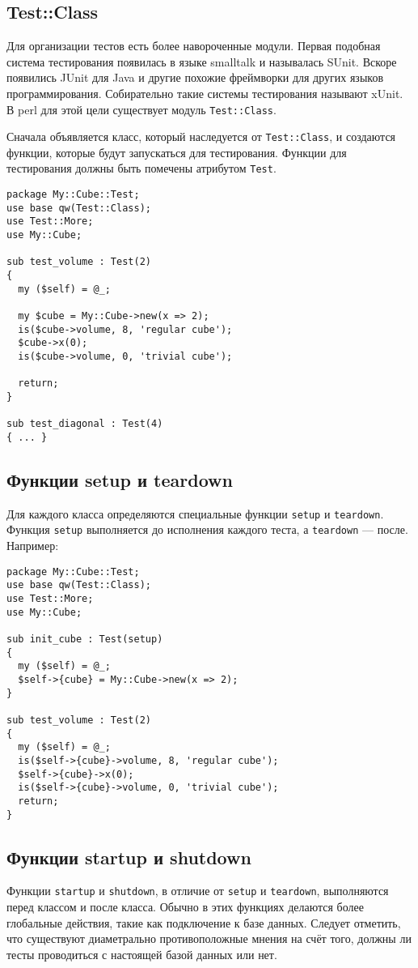 \subsection{Test::Class}
Для организации тестов есть более навороченные модули. Первая подобная система тестирования появилась в языке smalltalk и называлась SUnit. Вскоре появились JUnit для Java и другие похожие фреймворки для других языков программирования. Собирательно такие системы тестирования называют xUnit. В perl для этой цели существует модуль \verb|Test::Class|.

Сначала объявляется класс, который наследуется от \verb|Test::Class|, и создаются функции, которые будут запускаться для тестирования. Функции для тестирования должны быть помечены атрибутом \verb|Test|.
\begin{verbatim}
package My::Cube::Test;
use base qw(Test::Class);
use Test::More;
use My::Cube;

sub test_volume : Test(2)
{
  my ($self) = @_;

  my $cube = My::Cube->new(x => 2);
  is($cube->volume, 8, 'regular cube');
  $cube->x(0);
  is($cube->volume, 0, 'trivial cube');

  return;
}

sub test_diagonal : Test(4)
{ ... }
\end{verbatim}

\subsection{Функции setup и teardown}
Для каждого класса определяются специальные функции \verb|setup| и \verb|teardown|. Функция \verb|setup| выполняется до исполнения каждого теста, а \verb|teardown| --- после. Например:
\begin{verbatim}
package My::Cube::Test;
use base qw(Test::Class);
use Test::More;
use My::Cube;

sub init_cube : Test(setup)
{
  my ($self) = @_;
  $self->{cube} = My::Cube->new(x => 2);
}

sub test_volume : Test(2)
{
  my ($self) = @_;
  is($self->{cube}->volume, 8, 'regular cube');
  $self->{cube}->x(0);
  is($self->{cube}->volume, 0, 'trivial cube');
  return;
}
\end{verbatim}

\subsection{Функции startup и shutdown}
Функции \verb|startup| и \verb|shutdown|, в отличие от \verb|setup| и \verb|teardown|, выполняются перед классом и после класса. Обычно в этих функциях делаются более глобальные действия, такие как подключение к базе данных. Следует отметить, что существуют диаметрально противоположные мнения на счёт того, должны ли тесты проводиться с настоящей базой данных или нет.

